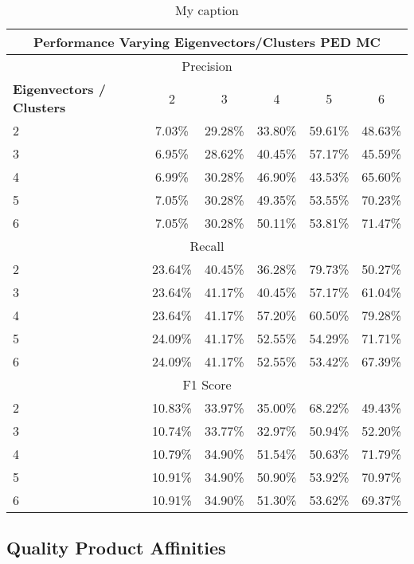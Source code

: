 \begin{table}[H]
\centering
\begin{tabular}{|l|c|c|c|c|c|}
\hline
\multicolumn{6}{|c|}{Performance Varying Eigenvectors/Clusters PED MC} \\ \hline
\multicolumn{6}{|c|}{Precision} \\ \hline
\textbf{Eigenvectors / Clusters} & 2 & 3 & 4 & 5 & 6 \\ \hline
2 & 7.03\% & 29.28\% & 33.80\% & 59.61\% & 48.63\%  \\ \hline
3 & 6.95\% & 28.62\% & 40.45\% & 57.17\% & 45.59\%  \\ \hline
4 & 6.99\% & 30.28\% & 46.90\% & 43.53\% & 65.60\%  \\ \hline
5 & 7.05\% & 30.28\% & 49.35\% & 53.55\% & 70.23\%  \\ \hline
6 & 7.05\% & 30.28\% & 50.11\% & 53.81\% & 71.47\%  \\ \hline
\multicolumn{6}{|c|}{Recall} \\ \hline
2 & 23.64\% & 40.45\% & 36.28\% & 79.73\% & 50.27\%  \\ \hline
3 & 23.64\% & 41.17\% & 40.45\% & 57.17\% & 61.04\%  \\ \hline
4 & 23.64\% & 41.17\% & 57.20\% & 60.50\% & 79.28\%  \\ \hline
5 & 24.09\% & 41.17\% & 52.55\% & 54.29\% & 71.71\%  \\ \hline
6 & 24.09\% & 41.17\% & 52.55\% & 53.42\% & 67.39\%  \\ \hline
\multicolumn{6}{|c|}{F1 Score} \\ \hline
2 & 10.83\% & 33.97\% & 35.00\% & 68.22\% & 49.43\%  \\ \hline
3 & 10.74\% & 33.77\% & 32.97\% & 50.94\% & 52.20\%  \\ \hline
4 & 10.79\% & 34.90\% & 51.54\% & 50.63\% & 71.79\%  \\ \hline
5 & 10.91\% & 34.90\% & 50.90\% & 53.92\% & 70.97\%  \\ \hline
6 & 10.91\% & 34.90\% & 51.30\% & 53.62\% & 69.37\%  \\ \hline
\end{tabular}
\caption[Performance Varying Eigenvector-Cluster]{My caption}
\label{tab:wh_ev_c}
\end{table}

\subsection{Quality Product Affinities}


